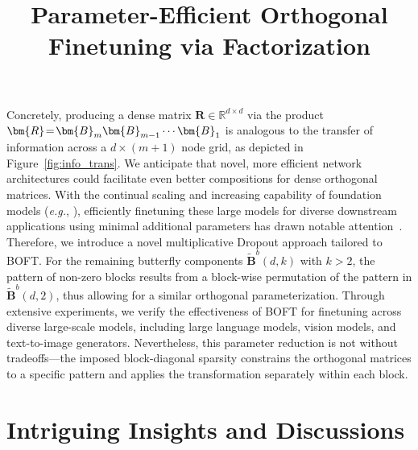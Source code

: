 \title{Parameter-Efficient Orthogonal Finetuning via Factorization}
Concretely, producing a dense matrix $\bm{R}\in\mathbb{R}^{d\times d}$ via the product $\thickmuskip=2mu \medmuskip=2mu \bm{R}=\bm{B}_m\bm{B}_{m-1}\cdots\bm{B}_1$ is analogous to the transfer of information across a $d\times(m+1)$ node grid, as depicted in Figure~\ref{fig:info_trans}. We anticipate that novel, more efficient network architectures could facilitate even better compositions for dense orthogonal matrices. With the continual scaling and increasing capability of foundation models (\emph{e.g.}, \cite{brown2020language,radford2021learning,rombach2022high,kirillov2023segment}), efficiently finetuning these large models for diverse downstream applications using minimal additional parameters has drawn notable attention~\cite{treviso2023efficient,ding2023parameter,lialin2023scaling}. Therefore, we introduce a novel multiplicative Dropout approach tailored to BOFT. For the remaining butterfly components $\tilde{\bm{B}}^b(d,k)$ with $k>2$, the pattern of non-zero blocks results from a block-wise permutation of the pattern in $\tilde{\bm{B}}^b(d,2)$, thus allowing for a similar orthogonal parameterization. Through extensive experiments, we verify the effectiveness of BOFT for finetuning across diverse large-scale models, including large language models, vision models, and text-to-image generators. Nevertheless, this parameter reduction is not without tradeoffs—the imposed block-diagonal sparsity constrains the orthogonal matrices to a specific pattern and applies the transformation separately within each block. \section{Intriguing Insights and Discussions}

